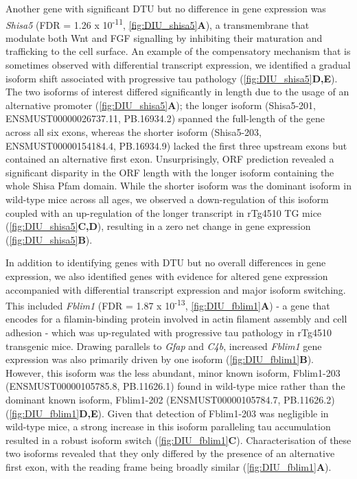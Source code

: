 Another gene with significant DTU but no difference in gene expression was \textit{Shisa5} (FDR = 1.26 x 10\textsuperscript{-11}, \cref{fig:DIU_shisa5}\textbf{A}), a transmembrane that modulate both Wnt and FGF signalling by inhibiting their maturation and trafficking to the cell surface\cite{Yamamoto2005}. An example of the compensatory mechanism that is sometimes observed with differential transcript expression, we identified a gradual isoform shift associated with progressive tau pathology (\cref{fig:DIU_shisa5}\textbf{D,E}). The two isoforms of interest differed significantly in length due to the usage of an alternative promoter (\cref{fig:DIU_shisa5}\textbf{A}); the longer isoform (Shisa5-201, ENSMUST00000026737.11, PB.16934.2) spanned the full-length of the gene across all six exons, whereas the shorter isoform (Shisa5-203, ENSMUST00000154184.4, PB.16934.9) lacked the first three upstream exons but contained an alternative first exon. Unsurprisingly, ORF prediction revealed a significant disparity in the ORF length with the longer isoform containing the whole Shisa Pfam domain. While the shorter isoform was the dominant isoform in wild-type mice across all ages, we observed a down-regulation of this isoform coupled with an up-regulation of the longer transcript in rTg4510 TG mice (\cref{fig:DIU_shisa5}\textbf{C,D}), resulting in a zero net change in gene expression (\cref{fig:DIU_shisa5}\textbf{B}). 

In addition to identifying genes with DTU but no overall differences in gene expression, we also identified genes with evidence for altered gene expression accompanied with differential transcript expression and major isoform switching. This included \textit{Fblim1} (FDR = 1.87 x 10\textsuperscript{-13}, \cref{fig:DIU_fblim1}\textbf{A}) - a gene that encodes for a filamin-binding protein involved in actin filament assembly and cell adhesion\cite{Takafuta2003} - which was up-regulated with progressive tau pathology in rTg4510 transgenic mice. Drawing parallels to \textit{Gfap} and \textit{C4b}, increased \textit{Fblim1} gene expression was also primarily driven by one isoform (\cref{fig:DIU_fblim1}\textbf{B}). However, this isoform was the less abundant, minor known isoform, Fblim1-203 (ENSMUST00000105785.8, PB.11626.1) found in wild-type mice rather than the dominant known isoform, Fblim1-202 (ENSMUST00000105784.7, PB.11626.2) (\cref{fig:DIU_fblim1}\textbf{D,E}). Given that detection of Fblim1-203 was negligible in wild-type mice, a strong increase in this isoform paralleling tau accumulation resulted in a robust isoform switch (\cref{fig:DIU_fblim1}\textbf{C}). Characterisation of these two isoforms revealed that they only differed by the presence of an alternative first exon, with the reading frame being broadly similar (\cref{fig:DIU_fblim1}\textbf{A}). 

